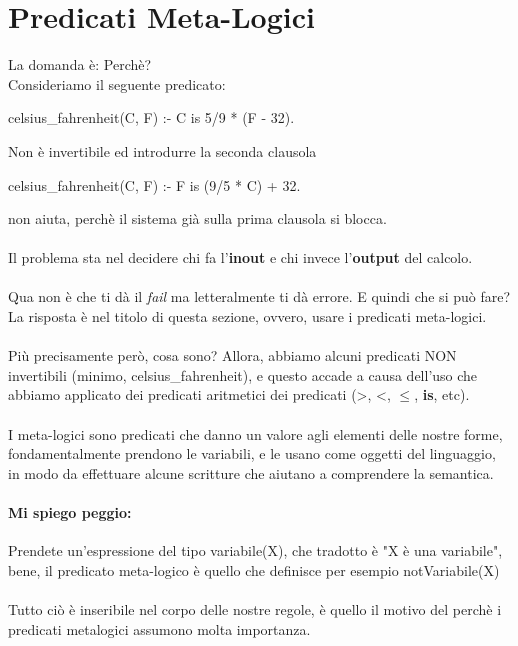 \documentclass[12pt, a4paper, openany, oneside]{book}
\begin{document}
\section{Predicati Meta-Logici}
La domanda è: Perchè?\\
Consideriamo il seguente predicato:
\begin{center}
celsius\_fahrenheit(C, F) :- C is 5/9 * (F - 32).
\end{center}
Non è \color{red}invertibile  \color{black} ed introdurre la seconda clausola
\begin{center}
celsius\_fahrenheit(C, F) :- F is (9/5 * C) + 32.
\end{center}
non aiuta, perchè il sistema già sulla prima clausola si blocca.\\ \\
Il problema sta nel decidere chi fa l'\textbf{inout} e chi invece l'\textbf{output}
del calcolo. \\ \\
Qua non è che ti dà il \textit{fail} ma letteralmente ti dà errore. E quindi
che si può fare? La risposta è nel titolo di questa sezione, ovvero, usare
i predicati meta-logici. \\ \\
Più precisamente però, cosa sono? Allora, abbiamo alcuni predicati NON 
invertibili (minimo, celsius\_fahrenheit), e questo accade a causa dell'uso che
abbiamo applicato dei predicati aritmetici dei predicati (>, <, $\leq$, 
\textbf{is}, etc). \\ \\
I meta-logici sono predicati che danno un valore agli elementi delle nostre forme,
fondamentalmente prendono le variabili, e le usano come oggetti del linguaggio,
in modo da effettuare alcune scritture che aiutano a comprendere la semantica.
%
\paragraph{Mi spiego peggio: } Prendete un'espressione del tipo variabile(X), 
che tradotto è "X è una variabile", bene, il predicato meta-logico è quello 
che definisce per esempio notVariabile(X)\\ \\
Tutto ciò è inseribile nel corpo delle nostre regole, è quello il motivo del
perchè i predicati metalogici assumono molta importanza.
\end{document}
